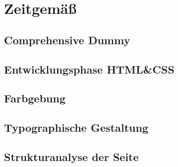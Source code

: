 \section{Zeitgemäß}

	\subsection{Comprehensive Dummy}

	\subsection{Entwicklungsphase HTML\&CSS}

	\subsection{Farbgebung}

	\subsection{Typographische Gestaltung}

	\subsection{Strukturanalyse der Seite}